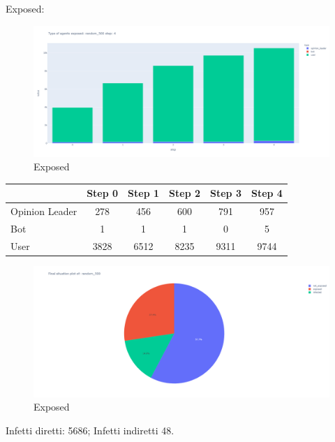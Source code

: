             Exposed:
            \begin{figure}[H]
                \includegraphics[width=16cm]{resources/charts/random_500_bar.png}
                \caption{Exposed}
                \label{fig:random_500_bar}
            \end{figure}
            
            \begin{table}[H]
                \centering
                \begin{tabular}{|l|c|c|c|c|c|}
                \hline
                               & Step 0 & Step 1 & Step 2 & Step 3 & Step 4 \\ \hline
                Opinion Leader & 278    & 456    & 600    & 791    & 957    \\ \hline
                Bot            & 1      & 1      & 1      & 0      & 5      \\ \hline
                User           & 3828   & 6512   & 8235   & 9311   & 9744   \\ \hline
                \end{tabular}
            \end{table}
            
            \begin{figure}[H]
                \includegraphics[width=16cm]{resources/charts/random_500_pie.png}
                \caption{Exposed}
                \label{fig:random_500_pie}
            \end{figure}
            Infetti diretti: 5686; \newline
            Infetti indiretti 48.
       
